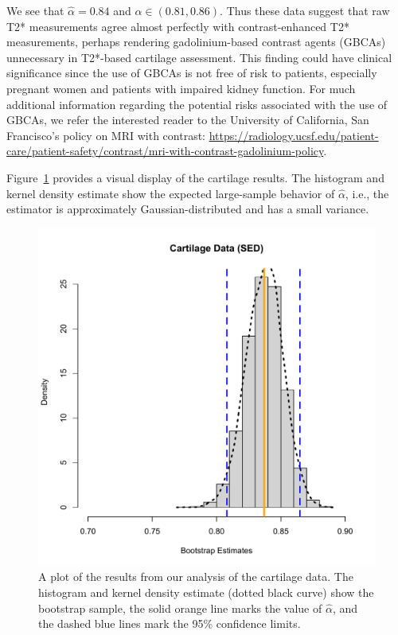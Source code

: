 We see that $\hat{\alpha}=0.84$ and $\alpha\in(0.81,0.86)$. Thus these data suggest that raw T2* measurements agree almost perfectly with contrast-enhanced T2* measurements, perhaps rendering gadolinium-based contrast agents (GBCAs) unnecessary in T2*-based cartilage assessment. This finding could have clinical significance since the use of GBCAs is not free of risk to patients, especially pregnant women and patients with impaired kidney function. For much additional information regarding the potential risks associated with the use of GBCAs, we refer the interested reader to the University of California, San Francisco's policy on MRI with contrast: \url{https://radiology.ucsf.edu/patient-care/patient-safety/contrast/mri-with-contrast-gadolinium-policy}.

Figure~\ref{fig:cartilage} provides a visual display of the cartilage results. The histogram and kernel density estimate show the expected large-sample behavior of $\hat{\alpha}$, i.e., the estimator is approximately Gaussian-distributed and has a small variance.

\begin{figure}[ht]
   \centering
   \includegraphics[scale=.65]{cartilage_sed}
   \caption{A plot of the results from our analysis of the cartilage data. The histogram and kernel density estimate (dotted black curve) show the bootstrap sample, the solid orange line marks the value of $\hat{\alpha}$, and the dashed blue lines mark the 95\% confidence limits.}
   \label{fig:cartilage}
\end{figure}

